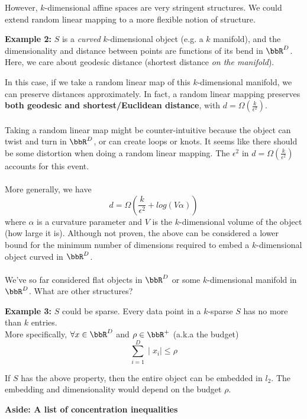 \begin{itemize}
  
 However, $k$-dimensional affine spaces are very stringent structures. We could extend random linear mapping to a more flexible notion of structure. \\
 \begin{itemize}
      \textbf{Example 2:} $S$ is a \textit{curved} $k$-dimensional object (e.g. a $k$ manifold), and the dimensionality and distance between points are functions of its bend in $\bbR^D$. Here, we care about geodesic distance (shortest distance \textit{on the manifold}). 
\end{itemize}
 In this case, if we take a random linear map of this $k$-dimensional manifold, we can preserve distances approximately. In fact, a random linear mapping preserves \textbf{both geodesic and shortest/Euclidean distance}, with $d = \Omega(\frac{k}{\epsilon^2})$. \\ \\
 Taking a random linear map might be counter-intuitive because the object can twist and turn in $\bbR^D$, or can create loops or knots. It seems like there should be some distortion when doing a random linear mapping. The $\epsilon^2$ in $d = \Omega(\frac{k}{\epsilon^2})$ accounts for this event. \\ \\
 More generally, we have
 $$ d = \Omega(\frac{k}{\epsilon^2} + log(V\alpha))$$
 where $\alpha$ is a curvature parameter and $V$ is the $k$-dimensional volume of the object (how large it is). Although not proven, the above can be considered a lower bound for the minimum number of dimensions required to embed a $k$-dimensional object curved in $\bbR^D$. \\ \\
 We've so far considered flat objects in $\bbR^D$ or some $k$-dimensional manifold in $\bbR^D$. What are other structures? \\
\begin{itemize}
      \textbf{Example 3:} $S$ could be sparse. Every data point in a $k$-sparse $S$ has no more than $k$ entries. \\
      More specifically, $\forall x \in \bbR^D$ and $\rho \in \bbR^+$ (a.k.a the budget) $$ \sum\limits_{i =1}^{D} \mid x_i \mid \leq \rho$$
\end {itemize}    
If $S$ has the above property, then the entire object can be embedded in $l_2$. The embedding and dimensionality would depend on the budget $\rho$.
\end{itemize}
\textbf{Aside: A list of concentration inequalities}
